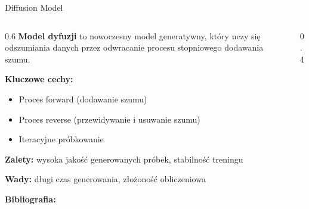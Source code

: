 \documentclass{beamer}
\begin{document}
\begin{frame}{Diffusion Model}
    \begin{columns}
        \begin{column}{0.6\textwidth}
            \textbf{Model dyfuzji} to nowoczesny model generatywny, który uczy się odszumiania danych przez odwracanie procesu stopniowego dodawania szumu.

            \medskip
            \textbf{Kluczowe cechy:}
            \begin{itemize}
                \item Proces forward (dodawanie szumu)
                \item Proces reverse (przewidywanie i usuwanie szumu)
                \item Iteracyjne próbkowanie
            \end{itemize}

            \textbf{Zalety:} wysoka jakość generowanych próbek, stabilność treningu

            \textbf{Wady:} długi czas generowania, złożoność obliczeniowa

            \textbf{Bibliografia:} \cite{ho2020denoising}
        \end{column}
        \begin{column}{0.4\textwidth}
            \centering
        \end{column}
    \end{columns}
\end{frame}
\end{document}

